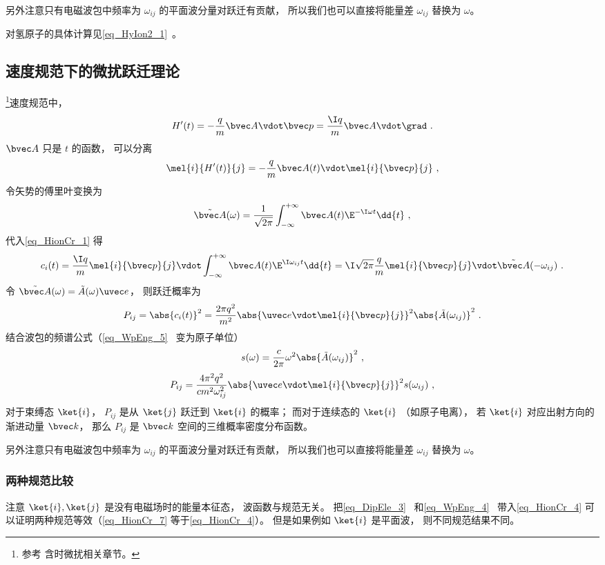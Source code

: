 另外注意只有电磁波包中频率为 $\omega_{ij}$ 的平面波分量对跃迁有贡献， 所以我们也可以直接将能量差 $\omega_{ij}$ 替换为 $\omega$。

对氢原子的具体计算见\autoref{eq_HyIon2_1}~。

\subsection{速度规范下的微扰跃迁理论}
\footnote{参考\cite{Merzbacher} 含时微扰相关章节。}速度规范中，
\begin{equation}
H'(t) = -\frac{q}{m}\bvec A \vdot \bvec p = \frac{\I q}{m}\bvec A \vdot \grad~.
\end{equation}
$\bvec A$ 只是 $t$ 的函数， 可以分离
\begin{equation}
\mel{i}{H'(t)}{j} = -\frac{q}{m}\bvec A(t) \vdot \mel{i}{\bvec p}{j}~,
\end{equation}
令矢势的傅里叶变换为
\begin{equation}
\tilde {\bvec A}(\omega) = \frac{1}{\sqrt{2\pi}} \int_{-\infty}^{+\infty} \bvec A(t) \E^{-\I\omega t} \dd{t}~,
\end{equation}
代入\autoref{eq_HionCr_1} 得
\begin{equation}\label{eq_HionCr_4}
c_i(t) = \frac{\I q}{m} \mel{i}{\bvec p}{j} \vdot \int_{-\infty}^{+\infty}  \bvec A(t) \E^{\I\omega_{ij} t} \dd{t} = \I\sqrt{2\pi}\frac{q}{m} \mel{i}{\bvec p}{j} \vdot \tilde {\bvec A}(-\omega_{ij})~.
\end{equation}
令 $\tilde {\bvec A}(\omega) = \tilde {A}(\omega)\uvec e$， 则跃迁概率为
\begin{equation}\label{eq_HionCr_3}
P_{ij} = \abs{c_i(t)}^2 = \frac{2\pi q^2}{m^2} \abs{\uvec e \vdot\mel{i}{\bvec p}{j}}^2 \abs{\tilde {A}(\omega_{ij})}^2~.
\end{equation}
结合波包的频谱公式（\autoref{eq_WpEng_5}~ 变为原子单位）
\begin{equation}
s(\omega) = \frac{c}{2\pi} \omega^2 \abs{\tilde {A}(\omega_{ij})}^2~,
\end{equation}
\begin{equation}\label{eq_HionCr_5}
P_{ij} = \frac{4\pi^2 q^2}{c m^2 \omega_{ij}^2} \abs{\uvec e \vdot\mel{i}{\bvec p}{j}}^2 s(\omega_{ij})~,
\end{equation}
对于束缚态 $\ket{i}$， $P_{ij}$ 是从 $\ket{j}$ 跃迁到 $\ket{i}$ 的概率； 而对于连续态的 $\ket{i}$ （如原子电离）， 若 $\ket{i}$ 对应出射方向的渐进动量 $\bvec k$， 那么 $P_{ij}$ 是 $\bvec k$ 空间的三维概率密度分布函数。

另外注意只有电磁波包中频率为 $\omega_{ij}$ 的平面波分量对跃迁有贡献， 所以我们也可以直接将能量差 $\omega_{ij}$ 替换为 $\omega$。

\subsubsection{两种规范比较}
注意 $\ket{i}, \ket{j}$ 是没有电磁场时的能量本征态， 波函数与规范无关。 把\autoref{eq_DipEle_3}~ 和\autoref{eq_WpEng_4}~ 带入\autoref{eq_HionCr_4} 可以证明两种规范等效（\autoref{eq_HionCr_7}  等于\autoref{eq_HionCr_4}）。 但是如果例如 $\ket{i}$ 是平面波， 则不同规范结果不同。
